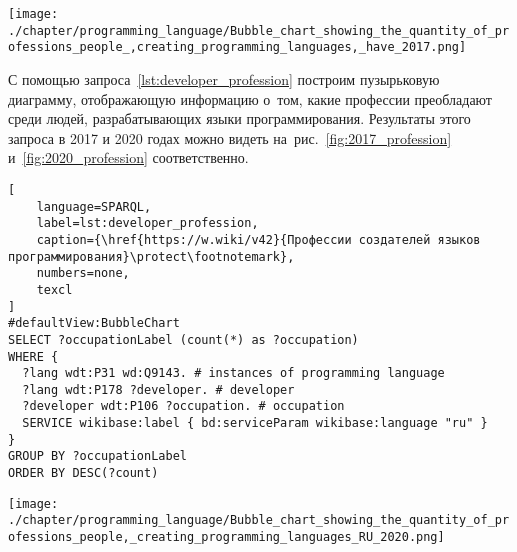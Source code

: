 \begin{marginfigure}[0pt]
\texttt{[image: ./chapter/programming\_language/Bubble\_chart\_showing\_the\_quantity\_of\_professions\_people\_,creating\_programming\_languages,\_have\_2017.png]}
  \caption[Профессии разработчиков языков программирования, 2017 год.]{Профессии разработчиков языков программирования, 2017 год. Размер пузырька показывает число разработчиков с соответствующей профессией\\}
  \label{fig:2017_profession}
\end{marginfigure}

С помощью запроса~\ref{lst:developer_profession} 
построим пузырьковую диаграмму, отображающую информацию о~том, 
какие профессии преобладают среди людей, разрабатывающих языки программирования. 
Результаты этого запроса в 2017 и 2020 годах можно видеть 
на~рис.~\ref{fig:2017_profession} и~\ref{fig:2020_profession} соответственно.


\begin{lstlisting}[
	language=SPARQL,
	label=lst:developer_profession,
	caption={\href{https://w.wiki/v42}{Профессии создателей языков программирования}\protect\footnotemark},
    numbers=none,
	texcl
]
#defaultView:BubbleChart
SELECT ?occupationLabel (count(*) as ?occupation)
WHERE {
  ?lang wdt:P31 wd:Q9143. # instances of programming language 
  ?lang wdt:P178 ?developer. # developer
  ?developer wdt:P106 ?occupation. # occupation
  SERVICE wikibase:label { bd:serviceParam wikibase:language "ru" }
}
GROUP BY ?occupationLabel 
ORDER BY DESC(?count)
\end{lstlisting}




\newpage
\begin{marginfigure}[0pt]
    \texttt{[image: ./chapter/programming\_language/Bubble\_chart\_showing\_the\_quantity\_of\_professions\_people,\_creating\_programming\_languages\_RU\_2020.png]}
    \caption[Профессии разработчиков языков программирования, 2020 год.]{Профессии разработчиков языков программирования, 2020 год. Размер пузырька показывает число разработчиков с соответствующей профессией\\ \\}
    \label{fig:2020_profession}
\end{marginfigure}


